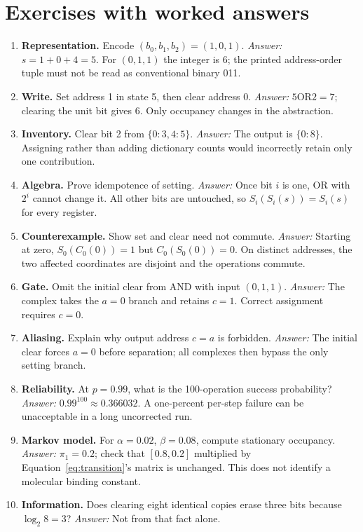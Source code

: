 \section{Exercises with worked answers}
\begin{enumerate}
\item \textbf{Representation.} Encode $(b_0,b_1,b_2)=(1,0,1)$.
\textit{Answer:} $s=1+0+4=5$. For $(0,1,1)$ the integer is 6;
the printed address-order tuple must not be read as conventional binary 011.
\item \textbf{Write.} Set address 1 in state 5, then clear address 0.
\textit{Answer:} $5\mathbin{\mathrm{OR}}2=7$; clearing the unit bit gives 6.
Only occupancy changes in the abstraction.
\item \textbf{Inventory.} Clear bit 2 from $\{0:3,4:5\}$.
\textit{Answer:} The output is $\{0:8\}$. Assigning rather than adding
dictionary counts would incorrectly retain only one contribution.
\item \textbf{Algebra.} Prove idempotence of setting.
\textit{Answer:} Once bit $i$ is one, OR with $2^i$ cannot change it.
All other bits are untouched, so $S_i(S_i(s))=S_i(s)$ for every register.
\item \textbf{Counterexample.} Show set and clear need not commute.
\textit{Answer:} Starting at zero, $S_0(C_0(0))=1$ but
$C_0(S_0(0))=0$. On distinct addresses, the two affected coordinates
are disjoint and the operations commute.
\item \textbf{Gate.} Omit the initial clear from AND with input $(0,1,1)$.
\textit{Answer:} The complex takes the $a=0$ branch and retains $c=1$.
Correct assignment requires $c=0$.
\item \textbf{Aliasing.} Explain why output address $c=a$ is forbidden.
\textit{Answer:} The initial clear forces $a=0$ before separation;
all complexes then bypass the only setting branch.
\item \textbf{Reliability.} At $p=0.99$, what is the 100-operation success
probability? \textit{Answer:} $0.99^{100}\approx0.366032$.
A one-percent per-step failure can be unacceptable in a long uncorrected run.
\item \textbf{Markov model.} For $\alpha=0.02$, $\beta=0.08$, compute
stationary occupancy. \textit{Answer:} $\pi_1=0.2$; check that
$[0.8,0.2]$ multiplied by Equation~\ref{eq:transition}'s matrix is unchanged.
This does not identify a molecular binding constant.
\item \textbf{Information.} Does clearing eight identical copies erase
three bits because $\log_2 8=3$? \textit{Answer:} Not from that fact alone.

\end{enumerate}
